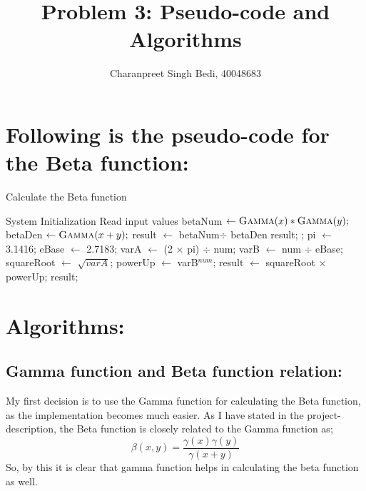 \documentclass[10pt]{article}
\title{Problem 3: Pseudo-code and Algorithms}
\author{Charanpreet Singh Bedi, 40048683}
\date{}
\begin{document}
\maketitle

\section{Following is the pseudo-code for the Beta function:}

\begin{algorithm}
\caption{Calculate the Beta function}
\begin{algorithmic}[1]

    \State System Initialization
    \State Read input values
    \State betaNum $\gets \textsc{Gamma}(x) * \textsc{Gamma}(y);$
    \State betaDen $\gets \textsc{Gamma}(x+y);$
    \State result $\gets$ betaNum$\div$ betaDen 
    \State \Return result;
    \Else
    \State \Return;
    \EndIf
\EndProcedure
\State
{}
    \State pi $\gets$ 3.1416; 
    \State eBase $\gets$ 2.7183; 
    \State varA $\gets$ (2 $\times$ pi) $\div$ num;
    \State varB $\gets$ num $\div$ eBase;
    \State squareRoot $\gets$ $\sqrt{varA}$;
    \State powerUp $\gets$ varB$^{num}$;
    \State result $\gets$ squareRoot $\times$ powerUp;
    \State \Return result;
\EndProcedure
\end{algorithmic}
\end{algorithm}

\section{Algorithms:}
\subsection{Gamma function and Beta function relation:}
My first decision is to use the Gamma function for calculating the Beta function, as the implementation becomes much easier. As I have stated in the project-description, the Beta function is closely related to the Gamma function as;
$$\beta(x,y) = \frac{\gamma(x)\gamma(y)}{\gamma(x+y)}$$
So, by this it is clear that gamma function helps in calculating the beta function as well.
\end{document}
